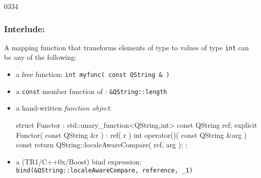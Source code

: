 \begin{slide}[fragile]{0334}
\frametitle{Interlude: }
  A mapping function that transforms elements of type  to
  values of type \texttt{int} can be any of the following:
  \begin{itemize}
  \item a free function:
    \texttt{int myfunc( const QString \& )}
  \item a \texttt{const} member function of :
    \texttt{\&QString::length}
  \item a hand-written \emph{function object}:
    \begin{cpp}
struct Functor : std::unary_function<QString,int> {
  const QString ref;
  explicit Functor( const QString &r ) : ref( r ) {}
  int operator()( const QString &arg ) const {
    return QString::localeAwareCompare( ref, arg );
  }
};\end{cpp}
  \item a (TR1/C++0x/Boost) bind expression:\\
    \texttt{bind(\&QString::localeAwareCompare, reference, \_1)}
  \end{itemize}
\end{slide}


